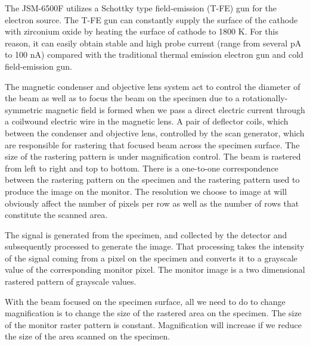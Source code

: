 The JSM-6500F utilizes a Schottky type field-emission (T-FE) gun for the electron source. The T-FE gun can constantly supply the surface of the cathode with zirconium oxide by heating the surface of cathode to 1800 K. For this reason, it can easily obtain stable and high probe current (range from several pA to 100 nA) compared with the traditional thermal emission electron gun and cold field-emission gun.

The magnetic condenser and objective lens system act to control the diameter of the beam as well as to focus the beam on the specimen due to a rotationally-symmetric magnetic field is formed when we pass a direct electric current through a coilwound electric wire in the magnetic lens. A pair of deflector coils, which between the condenser and objective lens, controlled by the scan generator, which are responsible for rastering that focused beam across the specimen surface. The size of the rastering pattern is under magnification control. The beam is rastered from left to right and top to bottom. There is a one-to-one correspondence between the rastering pattern on the specimen and the rastering pattern used to produce the image on the monitor. The resolution we choose to image at will obviously affect the number of pixels per row as well as the number of rows that constitute the scanned area.

The signal is generated from the specimen, and collected by the detector and subsequently processed to generate the image. That processing takes the intensity of the signal coming from a pixel on the specimen and converts it to a grayscale value of the corresponding monitor pixel. The monitor image is a two dimensional rastered pattern of grayscale values.

With the beam focused on the specimen surface, all we need to do to change magnification is to change the size of the rastered area on the specimen. The size of the monitor raster pattern is constant. Magnification will increase if we reduce the size of the area scanned on the specimen.

%
%